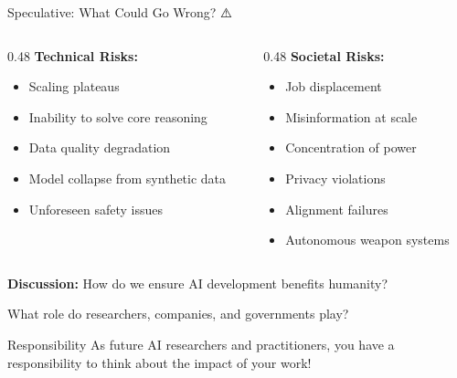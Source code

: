 \documentclass[aspectratio=169]{beamer}
\begin{document}
\begin{frame}[shrink=10]{Speculative: What Could Go Wrong? ⚠️}
\begin{columns}[T]
\begin{column}{0.48\textwidth}
\textbf{Technical Risks:}
\begin{itemize}\setlength{\itemsep}{0pt}
    \item Scaling plateaus
    \item Inability to solve core reasoning
    \item Data quality degradation
    \item Model collapse from synthetic data
    \item Unforeseen safety issues
\end{itemize}
\end{column}

\begin{column}{0.48\textwidth}
\textbf{Societal Risks:}
\begin{itemize}\setlength{\itemsep}{0pt}
    \item Job displacement
    \item Misinformation at scale
    \item Concentration of power
    \item Privacy violations
    \item Alignment failures
    \item Autonomous weapon systems
\end{itemize}
\end{column}
\end{columns}

\vspace{1em}

\begin{discussionbox}
\textbf{Discussion:} How do we ensure AI development benefits humanity?

What role do researchers, companies, and governments play?
\end{discussionbox}

\vspace{0.5em}

\begin{alertblock}{Responsibility}
As future AI researchers and practitioners, you have a responsibility to think about the impact of your work!
\end{alertblock}
\end{frame}
\end{document}
